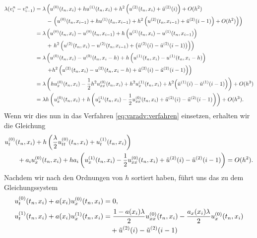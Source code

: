{\small\begin{align*}
\lambda (v^n_{i} - v^n_{i-1})
&= \lambda \left( u^{(0)}(t_n, x_i) + h u^{(1)}(t_n, x_i) + h^2 \left(u^{(2)}(t_n, x_i) + \tilde u^{(2)}(i) \right) + O(h^2) \right.\\
   &\qquad -  \left. \left( u^{(0)}(t_n, x_{i-1}) + h u^{(1)}(t_n, x_{i-1}) + h^2 \left( u^{(2)}(t_n, x_{i-1}) + \tilde u^{(2)}(i-1)\right)  + O(h^2) \right) \right)\\
&= \lambda \left( u^{(0)}(t_n, x_i) - u^{(0)}(t_n, x_{i-1}) + h \left( u^{(1)}(t_n, x_i) - u^{(1)}(t_n, x_{i-1}) \right) \right.\\
   &\qquad + \left. h^2 \left( u^{(2)}(t_n, x_i) - u^{(2)}(t_n, x_{i-1}) + \bigl( \tilde u^{(2)}(i) - \tilde u^{(2)}(i-1) \bigr) \right) \right)\\
&= \lambda \left( u^{(0)}(t_n, x_i) - u^{(0)}(t_n, x_i-h) + h \left( u^{(1)}(t_n, x_i) - u^{(1)}(t_n, x_i-h) \right) \right. \\
   &\qquad \left. + h^2 \left( u^{(2)}(t_n, x_i) - u^{(2)}(t_n, x_i-h) + \tilde u^{(2)}(i) - \tilde u^{(2)}(i-1) \right) \right)\\
&= \lambda \left( h u^{(0)}_x(t_n, x_i) - \frac 12 h^2 u^{(0)}_{xx}(t_n, x_i) + h^2 u^{(1)}_x(t_n, x_i) + h^2\Bigl( \tilde u^{(1)}(i) - \tilde u^{(1)}(i-1) \Bigr) \right) + O(h^3) \\
&= \lambda h \left( u^{(0)}_x(t_n, x_i) + h \left( u^{(1)}_x(t_n, x_i) - \frac 12 u^{(0)}_{xx}(t_n, x_i) + \tilde u^{(2)}(i) - \tilde u^{(2)}(i-1) \right) \right) + O(h^3).
\end{align*}}
Wenn wir dies nun in das Verfahren \eqref{eq:varadv:verfahren} einsetzen, erhalten wir die Gleichung
\begin{align*}
&u^{(0)}_t (t_n, x_i) + h \left( \frac \lambda 2 u^{(0)}_{tt}(t_n, x_i) + u^{(1)}_t(t_n, x_i) \right)\\ 
&\qquad +  a_i u^{(0)}_x(t_n, x_i) + h a_i \left( u^{(1)}_x(t_n, x_i) - \frac 12 u^{(0)}_{xx}(t_n, x_i) + \tilde u^{(2)}(i) - \tilde u^{(2)}(i-1) \right) = O(h^2).
\end{align*}
Nachdem wir nach den Ordnungen von $h$ sortiert haben, führt uns das zu dem Gleichungssystem
\begin{align*}
u^{(0)}_t(t_n, x_i) + a(x_i) u^{(0)}_x(t_n, x_i) &= 0,\\
u^{(1)}_t(t_n, x_i) + a(x_i) u^{(1)}_x(t_n, x_i) &= \frac {1 - a(x_i)\lambda}{2} u^{(0)}_{xx}(t_n, x_i) - \frac {a_x(x_i) \lambda} 2 u^{(0)}_x(t_n, x_i)\\
                                         & \quad + \tilde u^{(2)}(i) - \tilde u^{(2)}(i-1)
\end{align*}